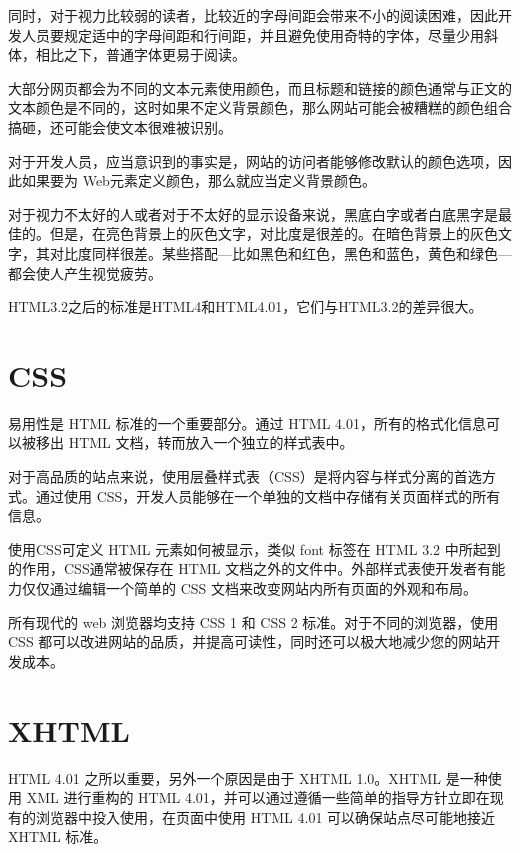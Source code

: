 同时，对于视力比较弱的读者，比较近的字母间距会带来不小的阅读困难，因此开发人员要规定适中的字母间距和行间距，并且避免使用奇特的字体，尽量少用斜体，相比之下，普通字体更易于阅读。

大部分网页都会为不同的文本元素使用颜色，而且标题和链接的颜色通常与正文的文本颜色是不同的，这时如果不定义背景颜色，那么网站可能会被糟糕的颜色组合搞砸，还可能会使文本很难被识别。

对于开发人员，应当意识到的事实是，网站的访问者能够修改默认的颜色选项，因此如果要为 Web元素定义颜色，那么就应当定义背景颜色。


对于视力不太好的人或者对于不太好的显示设备来说，黑底白字或者白底黑字是最佳的。但是，在亮色背景上的灰色文字，对比度是很差的。在暗色背景上的灰色文字，其对比度同样很差。某些搭配—比如黑色和红色，黑色和蓝色，黄色和绿色—都会使人产生视觉疲劳。



HTML3.2之后的标准是HTML4和HTML4.01，它们与HTML3.2的差异很大。





\section{CSS}

易用性是 HTML 标准的一个重要部分。通过 HTML 4.01，所有的格式化信息可以被移出 HTML 文档，转而放入一个独立的样式表中。

对于高品质的站点来说，使用层叠样式表（CSS）是将内容与样式分离的首选方式。通过使用 CSS，开发人员能够在一个单独的文档中存储有关页面样式的所有信息。

使用CSS可定义 HTML 元素如何被显示，类似 font 标签在 HTML 3.2 中所起到的作用，CSS通常被保存在 HTML 文档之外的文件中。外部样式表使开发者有能力仅仅通过编辑一个简单的 CSS 文档来改变网站内所有页面的外观和布局。

所有现代的 web 浏览器均支持 CSS 1 和 CSS 2 标准。对于不同的浏览器，使用 CSS 都可以改进网站的品质，并提高可读性，同时还可以极大地减少您的网站开发成本。






\section{XHTML}


HTML 4.01 之所以重要，另外一个原因是由于 XHTML 1.0。XHTML 是一种使用 XML 进行重构的 HTML 4.01，并可以通过遵循一些简单的指导方针立即在现有的浏览器中投入使用，在页面中使用 HTML 4.01 可以确保站点尽可能地接近 XHTML 标准。

